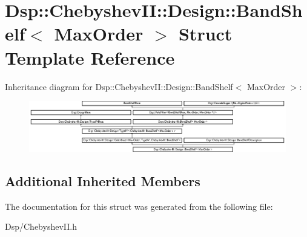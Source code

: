 \hypertarget{structDsp_1_1ChebyshevII_1_1Design_1_1BandShelf}{\section{Dsp\-:\-:Chebyshev\-I\-I\-:\-:Design\-:\-:Band\-Shelf$<$ Max\-Order $>$ Struct Template Reference}
\label{structDsp_1_1ChebyshevII_1_1Design_1_1BandShelf}
}
Inheritance diagram for Dsp\-:\-:Chebyshev\-I\-I\-:\-:Design\-:\-:Band\-Shelf$<$ Max\-Order $>$\-:\begin{figure}[H]
\begin{center}
\leavevmode
\includegraphics[height=2.217822cm]{structDsp_1_1ChebyshevII_1_1Design_1_1BandShelf}
\end{center}
\end{figure}
\subsection*{Additional Inherited Members}


The documentation for this struct was generated from the following file\-:\begin{DoxyCompactItemize}
\item 
Dsp/Chebyshev\-I\-I.\-h\end{DoxyCompactItemize}
